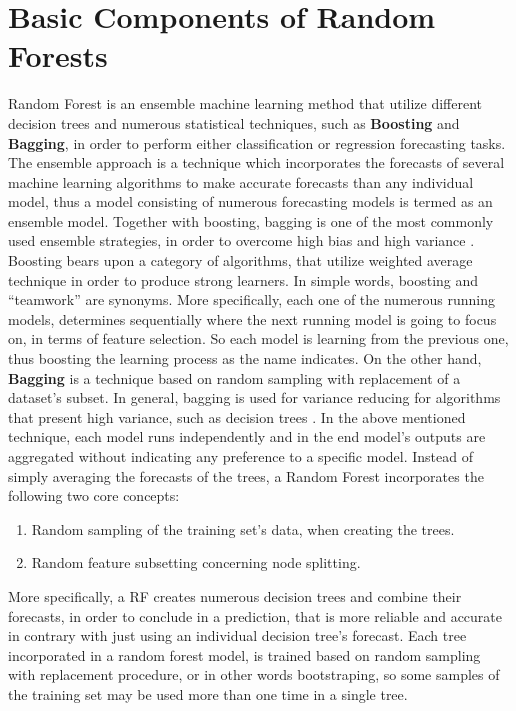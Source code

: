 \section{Basic Components of Random Forests}
Random Forest is an ensemble machine learning method that utilize
different decision trees and numerous statistical techniques, such as \textbf{Boosting} and \textbf{Bagging}, in order to perform either classification or regression forecasting tasks. The ensemble approach is a technique which incorporates the forecasts of several machine learning algorithms to make accurate forecasts than any individual model, thus a model consisting of numerous forecasting models is termed as an ensemble model. Together with boosting, bagging is one of the most commonly used ensemble strategies, in order to overcome high bias and high variance \cite{cutler2012random}. Boosting bears upon a category of algorithms, that utilize weighted average technique in order to produce strong learners. In simple words, boosting and “teamwork” are synonyms. More specifically, each one of the numerous running models, determines sequentially where the next running model is going to focus on, in terms of feature selection. So each model is learning from the previous one, thus boosting the learning process as the name indicates.
On the other hand, \textbf{Bagging} is a technique based on random sampling with replacement of a dataset's subset. In general, bagging is used for variance reducing for algorithms that present high variance, such as decision trees \cite{srivastava2014introduction}. In the above mentioned technique, each model runs independently and in the end model's outputs are aggregated without indicating any preference to a specific model. Instead of simply averaging the forecasts of the trees, a Random Forest incorporates the following two core concepts:
\begin{enumerate}
    \item Random sampling of the training set's data, when creating the trees.
    \item Random feature subsetting concerning node splitting.
\end{enumerate}
More specifically, a RF creates numerous decision trees and combine their forecasts, in order to conclude in a prediction, that is more reliable and accurate in contrary with just using an individual decision tree's forecast.
Each tree incorporated in a random forest model, is trained based on random sampling with replacement procedure, or in other words bootstraping, so some samples of the training set may be used more than one time in a single tree.
